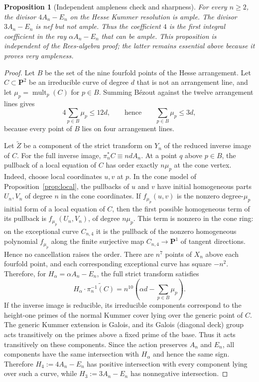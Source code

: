 \documentclass[11pt]{article}
\newtheorem{proposition}[theorem]{Proposition}
\newcommand{\PP}{\mathbf P}
\begin{document}
\begin{proposition}[Independent ampleness check and sharpness]\label{prop:hesse-sharp}
For every $n\ge2$, the divisor $4A_n-E_n$ on the Hesse Kummer resolution is
ample.  The divisor $3A_n-E_n$ is nef but not ample.  Thus the coefficient $4$
is the first integral coefficient in the ray $\alpha A_n-E_n$ that can be ample.
This proposition is independent of the Rees-algebra proof; the latter remains
essential above because it proves \emph{very} ampleness.
\end{proposition}

\begin{proof}
Let $B$ be the set of the nine fourfold points of the Hesse arrangement.  Let
$C\subset\PP^2$ be an irreducible curve of degree $d$ that is not an arrangement
line, and let $\mu_p=\operatorname{mult}_p(C)$ for $p\in B$.  Summing B\'ezout
against the twelve arrangement lines gives
\[
  4\sum_{p\in B}\mu_p\le 12d,
  \qquad\text{hence}\qquad
  \sum_{p\in B}\mu_p\le3d,
\]
because every point of $B$ lies on four arrangement lines.

Let $\widetilde Z$ be a component of the strict transform on $Y_n$ of the reduced
inverse image of $C$.  For the full inverse image, $\pi_n^*C\equiv ndA_n$.  At a
point $q$ above $p\in B$, the pullback of a local equation of $C$ has order
exactly $n\mu_p$ at the cone vertex.  Indeed, choose local coordinates $u,v$ at
$p$.  In the cone model of Proposition~\ref{prop:local}, the pullbacks of $u$ and
$v$ have initial homogeneous parts $U_n,V_n$ of degree $n$ in the cone
coordinates.  If $f_{\mu_p}(u,v)$ is the nonzero degree-$\mu_p$ initial form of
a local equation of $C$, then the first possible homogeneous term of its pullback
is $f_{\mu_p}(U_n,V_n)$, of degree $n\mu_p$.  This term is nonzero in the cone
ring: on the exceptional curve $C_{n,4}$ it is the pullback of the nonzero
homogeneous polynomial $f_{\mu_p}$ along the finite surjective map
$C_{n,4}\to\PP^1$ of tangent directions.  Hence no cancellation raises the
order.  There are $n^7$ points of $X_n$ above each fourfold point, and each
corresponding exceptional curve has square $-n^2$.  Therefore, for
$H_{\alpha}=\alpha A_n-E_n$, the full strict transform satisfies
\[
 H_{\alpha}\cdot \widetilde{\pi_n^{-1}(C)}
   =n^{10}\left(\alpha d-\sum_{p\in B}\mu_p\right).
\]
If the inverse image is reducible, its irreducible components correspond to the
height-one primes of the normal Kummer cover lying over the generic point of
$C$.  The generic Kummer extension is Galois, and its Galois (diagonal deck)
group acts transitively on the primes above a fixed prime of the base.  Thus it
acts transitively on these components.  Since the action preserves $A_n$ and
$E_n$, all components have the same intersection with $H_{\alpha}$ and hence the
same sign.  Therefore $H_4:=4A_n-E_n$ has positive intersection with
every component lying over such a curve, while $H_3:=3A_n-E_n$ has nonnegative
intersection.


\end{proof}
\end{document}
